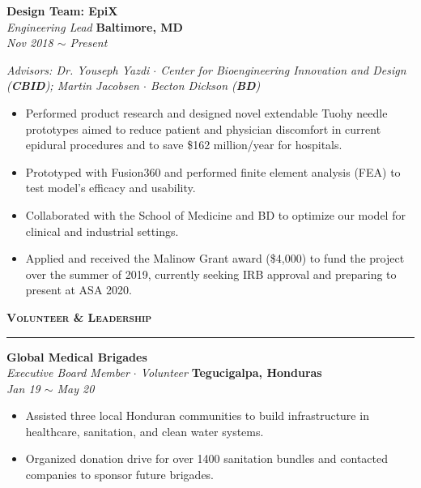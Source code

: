 \documentclass[10pt, letterpaper]{article}
\begin{document}
\begin{paracol}{2}
	\textbf{Design Team: EpiX}\\
	\textit{Engineering Lead}
	\switchcolumn
	\raggedleft\textbf{Baltimore, MD}\\
	\raggedleft\textit{Nov 2018 $\sim$ Present}
\end{paracol}\vspace{-1mm}
\textit{Advisors: Dr. Youseph Yazdi $\cdot$ Center for Bioengineering Innovation and
Design (\textbf{CBID}); Martin Jacobsen $\cdot$ Becton Dickson (\textbf{BD})}
\vspace{-2mm}
\begin{itemize}
	\item Performed product research and designed novel extendable Tuohy needle 
	prototypes aimed to reduce patient and 
	physician discomfort in current epidural procedures and to save \$162 million/year for 
	hospitals.\vspace{-3mm}
	\item Prototyped with Fusion360 and performed finite
	element analysis (FEA) to test model's efficacy and usability.\vspace{-3mm}
	\item Collaborated with the School of Medicine and BD to optimize our
	model for clinical and industrial settings.\vspace{-3mm}
	\item Applied and received the Malinow Grant award (\$4,000) to fund the project over 
	the summer of 2019, currently seeking IRB approval and preparing to present at ASA 2020. 
\end{itemize}

{\large \textbf{\textsc{Volunteer \& Leadership}}}
\vspace{5pt}
\hrule

\begin{paracol}{2}
	\textbf{Global Medical Brigades}\\
	\textit{Executive Board Member $\cdot$ Volunteer}
	\switchcolumn
	\raggedleft\textbf{Tegucigalpa, Honduras}\\
	\raggedleft\textit{Jan 19 $\sim$ May 20}
\end{paracol}\vspace{-1mm}
\vspace{-2mm}
\begin{itemize}
	\item Assisted three local Honduran communities to build infrastructure in healthcare, sanitation, and clean water systems.\vspace{-3mm}
	\item Organized donation drive for over 1400 sanitation bundles and contacted companies to sponsor future brigades.
\end{itemize}
\vspace{-2mm}
\end{document}
